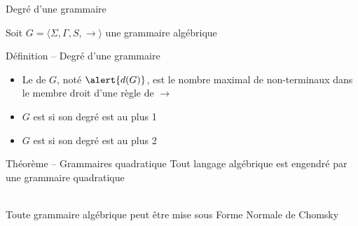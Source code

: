 
\begingroup

\begin{frame}{Degré d'une grammaire}
  
  Soit $G = \langle \Sigma, \Gamma, S, \rightarrow \rangle$ une grammaire algébrique\\
  \begin{block}{Définition -- Degré d'une grammaire}
    \begin{itemize}
    \item Le  de $G$, noté $\alert{d(G)}$,
      est le nombre maximal de non-terminaux dans le membre droit d'une règle de $\rightarrow$
    \item $G$ est  si son degré est au plus 1
      \begin{center}
      \end{center}
    \item $G$ est  si son degré est au plus 2
      \begin{center}
      \end{center}
    \end{itemize}
  \end{block}

  \begin{block}{Théorème -- Grammaires quadratique}
    Tout langage algébrique est engendré par une grammaire quadratique

    \vspace{3mm} \\Toute grammaire algébrique peut être mise sous Forme Normale de Chomsky
  \end{block}

\end{frame}

\endgroup

